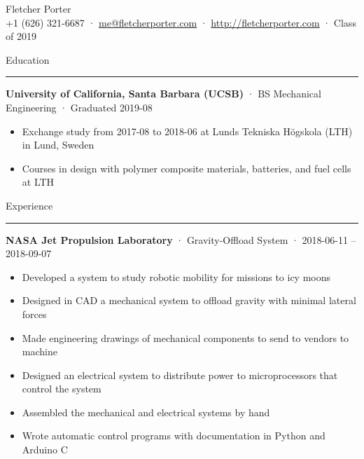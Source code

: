 \documentclass[12pt, oneside]{article}
\newcommand{\titlestyle}[1] {
	{\fontsize{50pt}{1em}\selectfont \textcolor{new_red}{\textsf{#1}}} \\
}
\newcommand{\headingstyleJobs}[1] {
	{\fontsize{19pt}{1em}\selectfont \textcolor{new_red}{\textsf{#1}}}
	\textcolor{new_red}{\rule{3.25in}{0.5pt}} \vspace{3pt}
}
\newcommand{\infostyle}[1] {
	{\fontsize{13pt}{1em}\selectfont #1} \\ \vspace{10pt}
}
\newcommand{\jobtitle}[3] {
	{\bf #1} · {#2} · {#3} \vspace{-7pt} \\
}
\begin{document}
\begin{flushleft}



\titlestyle{Fletcher Porter}
\infostyle{+1 (626) 321-6687 · \href{mailto:me@fletcherporter.com}{me@fletcherporter.com} · \url{http://fletcherporter.com} · Class of 2019}


\headingstyleJobs{Education}

\jobtitle{University of California, Santa Barbara (UCSB)}{BS Mechanical Engineering}{Graduated 2019-08}
\begin{itemize}
	\item Exchange study from 2017-08 to 2018-06 at Lunds Tekniska Högskola (LTH) in Lund, Sweden \\
	\item Courses in design with polymer composite materials, batteries, and fuel cells at LTH
\end{itemize}



\headingstyleJobs{Experience}

\jobtitle{NASA Jet Propulsion Laboratory}{Gravity-Offload System}{2018-06-11 – 2018-09-07}
\begin{itemize}
	\item Developed a system to study robotic mobility for missions to icy moons \\
	\item Designed in CAD a mechanical system to offload gravity with minimal lateral forces \\
	\item Made engineering drawings of mechanical components to send to vendors to machine \\
	\item Designed an electrical system to distribute power to microprocessors that control the system \\
	\item Assembled the mechanical and electrical systems by hand \\
	\item Wrote automatic control programs with documentation in Python and Arduino C
\end{itemize}


\end{flushleft}
\end{document}
